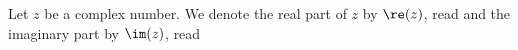 
\sbasic



\sstart





Let $z$ be a complex number.
We denote the real part
of $z$ by
$\re(z)$, read  and the imaginary
part by $\im(z)$,
read 

\strats
